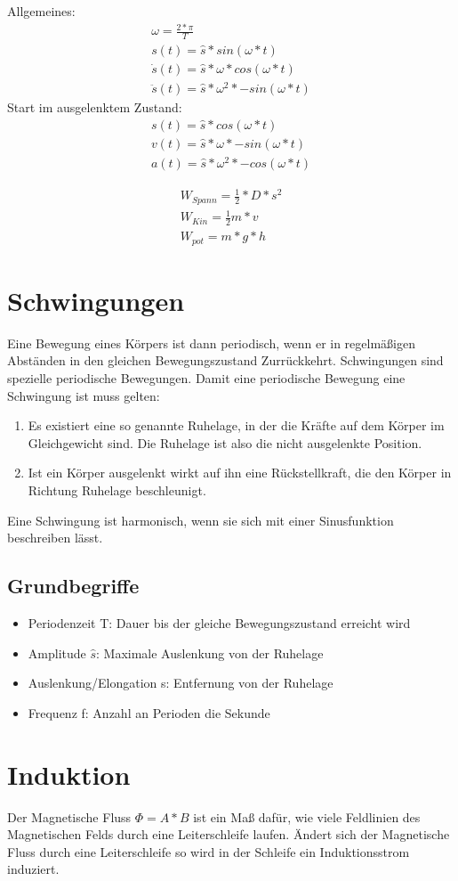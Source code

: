\documentclass{article}
\begin{document}
Allgemeines:
\begin{gather*}
    \omega = \frac{2*\pi}{T}\\
    s(t) = \hat{s} * sin(\omega*t)\\
    \dot{s}(t) = \hat{s} * \omega * cos(\omega*t)\\
    \ddot{s}(t) = \hat{s} * \omega^2 * -sin(\omega*t)
\end{gather*}
Start im ausgelenktem Zustand:
\begin{gather*}
    s(t) = \hat{s} * cos(\omega*t)\\
    v(t) = \hat{s} * \omega * -sin(\omega*t)\\
    a(t) = \hat{s} * \omega^2 * -cos(\omega*t)
\end{gather*}

\begin{gather*}
    W_{Spann} = \frac{1}{2} * D * s^2\\
    W_{Kin} = \frac{1}{2}  m * v\\
    W_{pot} = m*g*h
\end{gather*}

\section*{Schwingungen}
Eine Bewegung eines Körpers ist dann periodisch, wenn er in regelmäßigen
Abständen in den gleichen Bewegungszustand Zurrückkehrt. Schwingungen sind
spezielle periodische Bewegungen. Damit eine periodische Bewegung eine Schwingung
ist muss gelten:
\begin{enumerate}
    \item Es existiert eine so genannte Ruhelage, in der die Kräfte auf
    dem Körper im Gleichgewicht sind. Die Ruhelage ist also die nicht ausgelenkte Position.
    \item  Ist ein Körper ausgelenkt wirkt auf ihn eine Rückstellkraft, die den Körper in Richtung Ruhelage beschleunigt.
\end{enumerate}
Eine Schwingung ist harmonisch, wenn sie sich mit einer Sinusfunktion beschreiben lässt.
\subsection*{Grundbegriffe}
\begin{itemize}
    \item Periodenzeit T: Dauer bis der gleiche Bewegungszustand erreicht wird
    \item Amplitude $\hat{s}$: Maximale Auslenkung von der Ruhelage
    \item Auslenkung/Elongation s: Entfernung von der Ruhelage
    \item Frequenz f: Anzahl an Perioden die Sekunde
\end{itemize}

\section*{Induktion}
Der Magnetische Fluss $\Phi = A * B$ ist ein Maß dafür, wie viele Feldlinien des Magnetischen Felds durch eine Leiterschleife laufen.
Ändert sich der Magnetische Fluss durch eine Leiterschleife so wird in der Schleife ein Induktionsstrom induziert.
\end{document}
